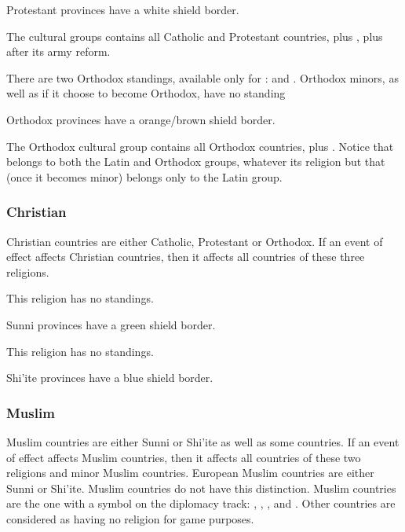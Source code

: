 \aparag Protestant provinces have a white shield border.

\aparag The  cultural groups contains all Catholic and Protestant
countries, plus \POL, plus \RUS after its army reform.

\aparag There are two Orthodox standings, available only for \RUS:
 and .
\bparag Orthodox minors, as well as \POL if it choose to become Orthodox, have
no standing

\aparag Orthodox provinces have a orange/brown shield border.

\aparag The Orthodox cultural group contains all Orthodox countries, plus
\POL.
\bparag Notice that \POL belongs to both the Latin and Orthodox groups,
whatever its religion but that \paysPologne (once it becomes minor) belongs
only to the Latin group.


\subsubsection{Christian}
\aparag Christian countries are either Catholic, Protestant or Orthodox.
\bparag If an event of effect affects Christian countries, then it affects all
countries of these three religions.

\aparag This religion has no standings.

\aparag Sunni provinces have a green shield border.

\aparag This religion has no standings.

\aparag Shi'ite provinces have a blue shield border.


\subsubsection{Muslim}
\aparag Muslim countries are either Sunni or Shi'ite as well as some \ROTW
countries.
\bparag If an event of effect affects Muslim countries, then it affects all
countries of these two religions and \ROTW minor Muslim countries.
\bparag European Muslim countries are either Sunni or Shi'ite. \ROTW Muslim
countries do not have this distinction.
\bparag \ROTW Muslim countries are the one with a \Xsunnite symbol on the
\ROTW diplomacy track: \paysAden, \paysOman, \paysSoudan, \paysGujerat and
. Other \ROTW countries are considered as having no religion for
game purposes.

